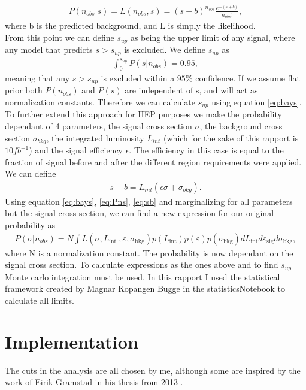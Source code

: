 \documentclass{article}
\begin{document}
\begin{align}\label{eq:Pns}
    P(n_{obs}|s) = L(n_{obs},s) = (s+b)^{n_{obs}} \frac{e^{-(s+b)}}{n_{obs}!},
\end{align}
where b is the predicted background, and L is simply the likelihood. 
\\
From this point we can define $s_{up}$ as being the upper limit of any signal, where any model that predicts $s>s_{up}$ is excluded. We define $s_{up}$ as
\begin{align}
    \int_0^{s_{up}} P(s|n_{obs})  = 0.95,
\end{align}
meaning that any $s>s_{up}$ is excluded within a $95\%$ confidence. If we assume flat prior both $P(n_{obs})$ and $P(s)$ are independent of s, and will act as normalization constants. Therefore we can calculate $s_{up}$ using equation \ref{eq:bays}. 
\\
To further extend this approach for HEP purposes we make the probability dependant of 4 parameters, the signal cross section $\sigma$, the background cross section $\sigma_{bkg}$,  the integrated luminosity $L_{int}$ (which for the sake of this rapport is $10fb^{-1}$) and the signal efficiency $\epsilon$. The efficiency in this case is equal to the fraction of signal before and after the different region requirements were applied. 
\\
We can define 
\begin{align}\label{eq:sb}
    s+b = L_{int} (\epsilon \sigma + \sigma_{bkg}).
\end{align}
Using equation \ref{eq:bays}, \ref{eq:Pns}, \ref{eq:sb} and marginalizing for all parameters but the signal cross section, we can find a new expression for our original probability as
\begin{align}
    P(\sigma | n_{obs}) =N \int L\left(\sigma, L_{\text {int }}, \varepsilon, \sigma_{\mathrm{bkg}}\right) p\left(L_{\mathrm{int}}\right) p\left(\varepsilon\right) p\left(\sigma_{\mathrm{bkg}}\right) d L_{\mathrm{int}} d \varepsilon_{\mathrm{sig}} d \sigma_{\mathrm{bkg}},
\end{align}
where N is a normalization constant. The probability is now dependant on the signal cross section. To calculate expressions as the ones above and to find $s_{up}$ Monte carlo integration must be used. In this rapport I used the statistical framework created by Magnar Kopangen Bugge in the statisticsNotebook to calculate all limits.
\section{Implementation}
The cuts in the analysis are all chosen by me, although some are inspired by the work of Eirik Gramstad in his thesis from 2013 \cite{Gramstad:2013loc}.
\end{document}
